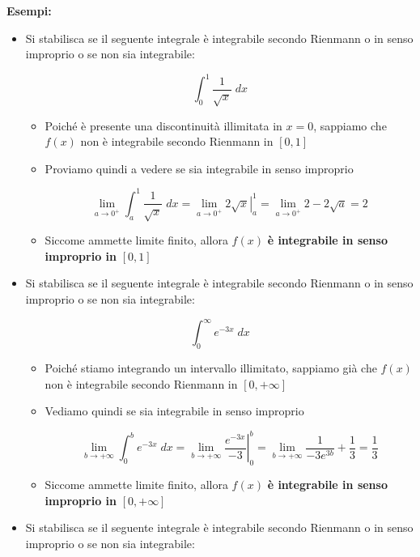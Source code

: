 \documentclass[a4paper, 12pt]{report}
\begin{document}
    \textbf{Esempi:}
    \begin{itemize}
        \item Si stabilisca se il seguente integrale è integrabile secondo Rienmann o in senso improprio o se non sia integrabile:
        
        \[\int_{0}^{1} \frac{1}{\sqrt{x}} \; dx\]
        
        \begin{itemize}
            \item Poiché è presente una discontinuità illimitata in $x=0$, sappiamo che $f(x)$ non è integrabile secondo Rienmann in $[0, 1]$
            \item Proviamo quindi a vedere se sia integrabile in senso improprio
            
            \[\lim_{a \to 0^+}\int_{a}^{1} \frac{1}{\sqrt{x}} \; dx = \lim_{a \to 0^+}  \left . 2\sqrt{x} \right |_{a}^{1} = \lim_{a \to 0^+} 2 - 2\sqrt{a} = 2\]
            
            \item Siccome ammette limite finito, allora $f(x)$ \textbf{è integrabile in senso improprio in }$[0, 1]$ 
        \end{itemize}
        
        
        \item Si stabilisca se il seguente integrale è integrabile secondo Rienmann o in senso improprio o se non sia integrabile:
        
        \[\int_{0}^{\infty} e^{-3x} \; dx\]
        
        \begin{itemize}
            \item Poiché stiamo integrando un intervallo illimitato, sappiamo già che $f(x)$ non è integrabile secondo Rienmann in $[0, +\infty]$
            
            \item Vediamo quindi se sia integrabile in senso improprio
            
            \[\lim_{b \to +\infty} \int_{0}^{b} e^{-3x} \; dx = \lim_{b \to +\infty} \left . \frac{e^{-3x}}{-3} \right |_{0}^{b} = \lim_{b \to +\infty} \frac{1}{-3e^{3b}} + \frac{1}{3} = \frac{1}{3}\]
            
            \item Siccome ammette limite finito, allora $f(x)$ \textbf{è integrabile in senso improprio in} $[0, +\infty]$
            
        \end{itemize}\item Si stabilisca se il seguente integrale è integrabile secondo Rienmann o in senso improprio o se non sia integrabile:
        

\end{itemize}
\end{document}
